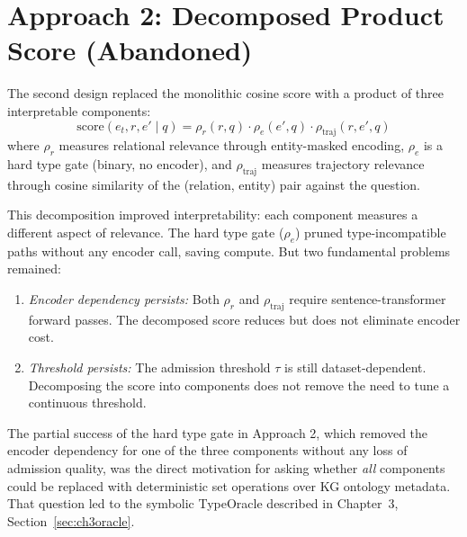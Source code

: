\section{Approach 2: Decomposed Product Score (Abandoned)}

The second design replaced the monolithic cosine score with a product of three interpretable components:
\begin{equation}
  \text{score}(e_t, r, e' \mid q) = \rho_r(r, q) \cdot \rho_e(e', q) \cdot \rho_{\text{traj}}(r, e', q)
  \label{eq:appc_decomposed}
\end{equation}
where $\rho_r$ measures relational relevance through entity-masked encoding, $\rho_e$ is a hard type gate (binary, no encoder), and $\rho_{\text{traj}}$ measures trajectory relevance through cosine similarity of the (relation, entity) pair against the question.

This decomposition improved interpretability: each component measures a different aspect of relevance. The hard type gate ($\rho_e$) pruned type-incompatible paths without any encoder call, saving compute. But two fundamental problems remained:

\begin{enumerate}
  \item \textit{Encoder dependency persists:} Both $\rho_r$ and $\rho_{\text{traj}}$ require sentence-transformer forward passes. The decomposed score reduces but does not eliminate encoder cost.
  \item \textit{Threshold persists:} The admission threshold $\tau$ is still dataset-dependent. Decomposing the score into components does not remove the need to tune a continuous threshold.
\end{enumerate}

The partial success of the hard type gate in Approach 2, which removed the encoder dependency for one of the three components without any loss of admission quality, was the direct motivation for asking whether \textit{all} components could be replaced with deterministic set operations over KG ontology metadata. That question led to the symbolic TypeOracle described in Chapter~3, Section~\ref{sec:ch3oracle}.
